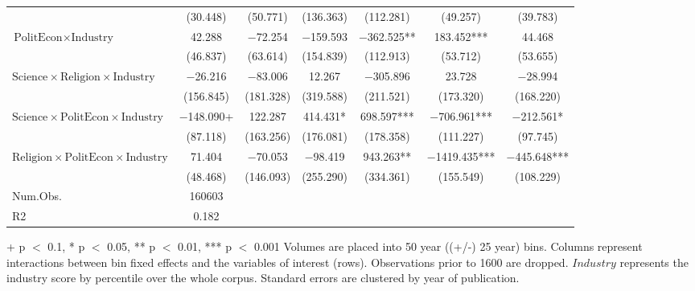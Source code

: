 \begin{table}
\begin{threeparttable}
\begin{tabular}[t]{lcccccc}
 & (\num{30.448}) & (\num{50.771}) & (\num{136.363}) & (\num{112.281}) & (\num{49.257}) & (\num{39.783})\\
$\text{PolitEcon} \times \text{Industry}$ & \num{42.288} & \num{-72.254} & \num{-159.593} & \num{-362.525}** & \num{183.452}*** & \num{44.468}\\
 & (\num{46.837}) & (\num{63.614}) & (\num{154.839}) & (\num{112.913}) & (\num{53.712}) & (\num{53.655})\\
$\text{Science} \times \text{Religion} \times \text{Industry}$ & \num{-26.216} & \num{-83.006} & \num{12.267} & \num{-305.896} & \num{23.728} & \num{-28.994}\\
 & (\num{156.845}) & (\num{181.328}) & (\num{319.588}) & (\num{211.521}) & (\num{173.320}) & (\num{168.220})\\
$\text{Science} \times \text{PolitEcon} \times \text{Industry}$ & \num{-148.090}+ & \num{122.287} & \num{414.431}* & \num{698.597}*** & \num{-706.961}*** & \num{-212.561}*\\
 & (\num{87.118}) & (\num{163.256}) & (\num{176.081}) & (\num{178.358}) & (\num{111.227}) & (\num{97.745})\\
$\text{Religion} \times \text{PolitEcon} \times \text{Industry}$ & \num{71.404} & \num{-70.053} & \num{-98.419} & \num{943.263}** & \num{-1419.435}*** & \num{-445.648}***\\
 & (\num{48.468}) & (\num{146.093}) & (\num{255.290}) & (\num{334.361}) & (\num{155.549}) & (\num{108.229})\\
\midrule
Num.Obs. & \num{160603} &  &  &  &  & \\
R2 & \num{0.182} &  &  &  &  & \\
\bottomrule
\end{tabular}
\begin{tablenotes}
\item + p $<$ 0.1, * p $<$ 0.05, ** p $<$ 0.01, *** p $<$ 0.001 Volumes are placed into 50 year ((+/-) 25 year) bins. Columns represent interactions between bin fixed effects and the variables of interest (rows). Observations prior to 1600 are dropped. $Industry$ represents the industry score by percentile over the whole corpus. Standard errors are clustered by year of publication.
\end{tablenotes}
\end{threeparttable}
\end{table}
